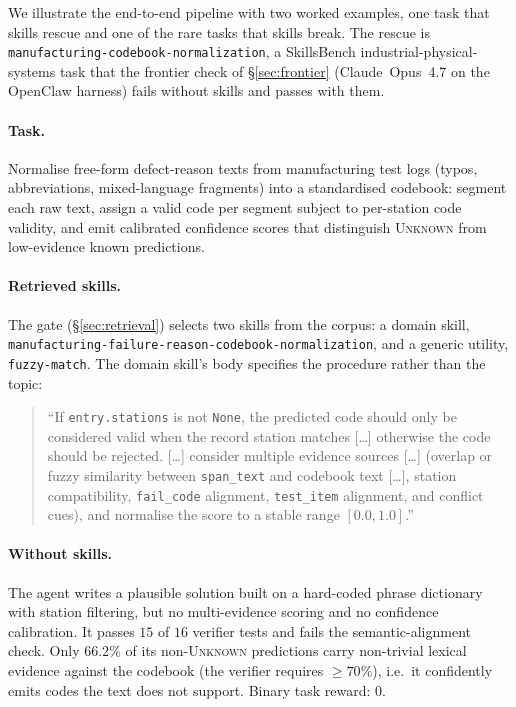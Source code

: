 We illustrate the end-to-end pipeline with two worked examples,
one task that skills rescue and one of the rare tasks that
skills break.  The rescue is
\texttt{manufacturing-\allowbreak codebook-\allowbreak normalization}, a SkillsBench
industrial-physical-systems task that the frontier check of
\S\ref{sec:frontier} (Claude~Opus~4.7 on the OpenClaw harness)
fails without skills and passes with them.

\paragraph{Task.}
Normalise free-form defect-reason texts from manufacturing test
logs (typos, abbreviations, mixed-language fragments) into a
standardised codebook: segment each raw text, assign a valid
code per segment subject to per-station code validity, and emit
calibrated confidence scores that distinguish \textsc{Unknown}
from low-evidence known predictions.

\paragraph{Retrieved skills.}
The gate (\S\ref{sec:retrieval}) selects two skills from the
corpus: a domain skill,
\texttt{manufacturing-\allowbreak failure-\allowbreak reason-\allowbreak codebook-\allowbreak normalization},
and a generic utility, \texttt{fuzzy-match}.  The domain skill's
body specifies the procedure rather than the topic:

\begin{quote}\small
``If \texttt{entry.stations} is not \texttt{None}, the predicted
code should only be considered valid when the record station
matches [\ldots] otherwise the code should be rejected.
[\ldots] consider multiple evidence sources [\ldots] (overlap or
fuzzy similarity between \texttt{span\_text} and codebook text
[\ldots], station compatibility, \texttt{fail\_code} alignment,
\texttt{test\_item} alignment, and conflict cues), and normalise
the score to a stable range $[0.0, 1.0]$.''
\end{quote}

\paragraph{Without skills.}
The agent writes a plausible solution built on a hard-coded
phrase dictionary with station filtering, but no multi-evidence
scoring and no confidence calibration.  It passes $15$ of $16$
verifier tests and fails the semantic-alignment check.  Only
$66.2\%$ of its non-\textsc{Unknown} predictions carry
non-trivial lexical evidence against the codebook (the verifier
requires $\geq 70\%$), i.e.\ it confidently emits codes the text
does not support.  Binary task reward: $0$.

